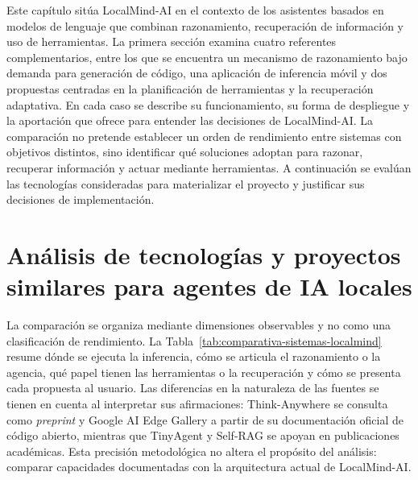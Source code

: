 
Este capítulo sitúa LocalMind-AI en el contexto de los asistentes basados en modelos de lenguaje que combinan razonamiento, recuperación de información y uso de herramientas. La primera sección examina cuatro referentes complementarios, entre los que se encuentra un mecanismo de razonamiento bajo demanda para generación de código, una aplicación de inferencia móvil y dos propuestas centradas en la planificación de herramientas y la recuperación adaptativa. En cada caso se describe su funcionamiento, su forma de despliegue y la aportación que ofrece para entender las decisiones de LocalMind-AI. La comparación no pretende establecer un orden de rendimiento entre sistemas con objetivos distintos, sino identificar qué soluciones adoptan para razonar, recuperar información y actuar mediante herramientas. A continuación se evalúan las tecnologías consideradas para materializar el proyecto y justificar sus decisiones de implementación.

\section{Análisis de tecnologías y proyectos similares para agentes de IA locales}\label{sec:tecnologias-similares-locales}

La comparación se organiza mediante dimensiones observables y no como una clasificación de rendimiento. La Tabla~\ref{tab:comparativa-sistemas-localmind} resume dónde se ejecuta la inferencia, cómo se articula el razonamiento o la agencia, qué papel tienen las herramientas o la recuperación y cómo se presenta cada propuesta al usuario. Las diferencias en la naturaleza de las fuentes se tienen en cuenta al interpretar sus afirmaciones: Think-Anywhere se consulta como \emph{preprint} y Google AI Edge Gallery a partir de su documentación oficial de código abierto, mientras que TinyAgent y Self-RAG se apoyan en publicaciones académicas. Esta precisión metodológica no altera el propósito del análisis: comparar capacidades documentadas con la arquitectura actual de LocalMind-AI.

